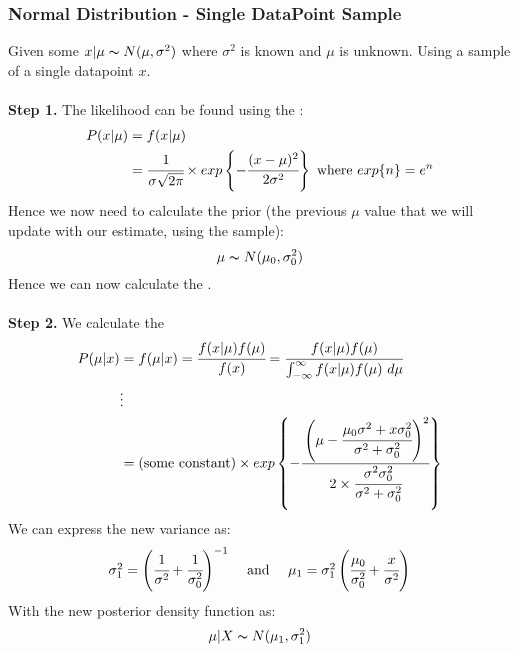 \documentclass{report}
\begin{document}
            \subsubsection*{Normal Distribution - Single DataPoint Sample}
                Given some $x|\mu \thicksim N(\mu, \sigma^2)$ where $\sigma^2$ is known and $\mu$ is unknown. Using a sample of a single datapoint $x$.
                \\
                \\ \textbf{Step 1.} The likelihood can be found using the :
                \[\begin{split}
                    P(x|\mu) &= f(x|\mu) \\
                    &= \cfrac{1}{\sigma \sqrt{2 \pi}} \times exp \left\{ -\cfrac{(x - \mu)^2}{2 \sigma^2} \right\} \text{  where  $exp\{n\} = e^n$}\\
                \end{split}\]
                Hence we now need to calculate the prior (the previous $\mu$ value that we will update with our estimate, using the sample):
                \[\mu \thicksim N(\mu_0, \sigma^2_0)\]
                Hence we can now calculate the .
                \\
                \\ \textbf{Step 2.} We calculate the 
                \[\begin{split}
                    P(\mu|x) &= f(\mu|x) = \cfrac{f(x|\mu)f(\mu)}{f(x)} = \cfrac{f(x|\mu)f(\mu)}{\int_{-\infty}^\infty f(x|\mu)f(\mu) \ d \mu} \\
                    & \vdots \\
                    &= \text{(some constant)} \times exp\left\{ -\cfrac{\left( \mu - \cfrac{\mu_0\sigma^2 + x \sigma_0^2}{\sigma^2 + \sigma_0^2} \right)^2}{2 \times \cfrac{\sigma^2\sigma_0^2}{\sigma^2 + \sigma_0^2}} \right\} \\
                \end{split}\]
                We can express the new variance as:
                \[\begin{matrix}
                    \sigma^2_1 = \left( \cfrac{1}{\sigma^2} + \cfrac{1}{\sigma_0^2} \right)^{-1} & \text{  and  } & \mu_1 = \sigma_1^2 \left( \cfrac{\mu_0}{\sigma_0^2} + \cfrac{x}{\sigma^2} \right)  \\
                \end{matrix}\]
                With the new posterior density function as:
                \[\mu|X \thicksim N(\mu_1, \sigma^2_1)\]
\end{document}

